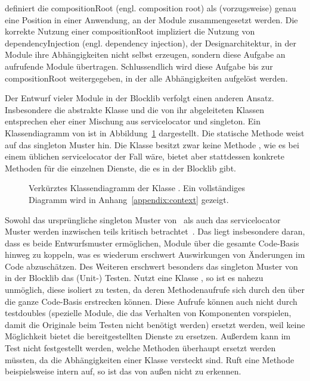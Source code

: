 \textcite[S.~76]{Seemann2012} definiert die \gls{compositionRoot} (engl. composition root) als (vorzugsweise) genau eine Position in einer Anwendung, an der Module zusammengesetzt werden. Die korrekte Nutzung einer \gls{compositionRoot} impliziert die Nutzung von \gls{dependencyInjection} (engl. dependency injection), der Designarchitektur, in der Module ihre Abhängigkeiten nicht selbst erzeugen, sondern diese Aufgabe an aufrufende Module übertragen. Schlussendlich wird diese Aufgabe bis zur \gls{compositionRoot} weitergegeben, in der alle Abhängigkeiten aufgelöst werden. 


Der Entwurf vieler Module in der Blocklib verfolgt einen anderen Ansatz. Insbesondere die abstrakte Klasse \classContext{} und die von ihr abgeleiteten Klassen entsprechen eher einer Mischung aus \gls{servicelocator} und \gls{singleton}. Ein Klassendiagramm von \classContext{} ist in Abbildung~\ref{fig:diagContext} dargestellt. Die statische Methode  weist auf das \gls{singleton} Muster hin. Die Klasse besitzt zwar keine Methode , wie es bei einem üblichen \gls{servicelocator} der Fall wäre, bietet aber stattdessen konkrete Methoden für die einzelnen Dienste, die es in der Blocklib gibt.

\begin{figure}
  \begin{center}
    
  \end{center}
  \caption[Verkürztes Klassendiagramm der Klasse \classContext{}.]{Verkürztes Klassendiagramm der Klasse \classContext{}. Ein vollständiges Diagramm wird in Anhang~\vref{appendix:context} gezeigt.}\label{fig:diagContext}
\end{figure}

Sowohl das ursprüngliche \gls{singleton} Muster von~\textcite[S.~127~\psqq]{Gamma2016} als auch das \gls{servicelocator} Muster werden inzwischen teils kritisch betrachtet~\cites[S.~103~\psqq]{Nystrom2015}[S.~154~\psqq]{Seemann2012}. Das liegt insbesondere daran, dass es beide Entwurfsmuster ermöglichen, Module über die gesamte Code-Basis hinweg zu koppeln, was es wiederum erschwert Auswirkungen von Änderungen im Code abzuschätzen. Des Weiteren erschwert besonders das \gls{singleton} Muster von \classContext{} in der Blocklib das (Unit-) Testen. Nutzt eine Klasse \classContext{}, so ist es nahezu unmöglich, diese isoliert zu testen, da deren Methodenaufrufe sich durch den \classContext{} über die ganze Code-Basis erstrecken können. Diese  Aufrufe können auch nicht durch \glspl{testdouble} (spezielle Module, die das Verhalten von Komponenten vorspielen, damit die Originale beim Testen nicht benötigt werden) ersetzt werden, weil \classContext{} keine Möglichkeit bietet die bereitgestellten Dienste zu ersetzen. Außerdem kann im Test nicht festgestellt werden, welche Methoden überhaupt ersetzt werden müssten, da die Abhängigkeiten einer Klasse versteckt sind. Ruft eine Methode beispielsweise intern  auf, so ist das von außen nicht zu erkennen.

